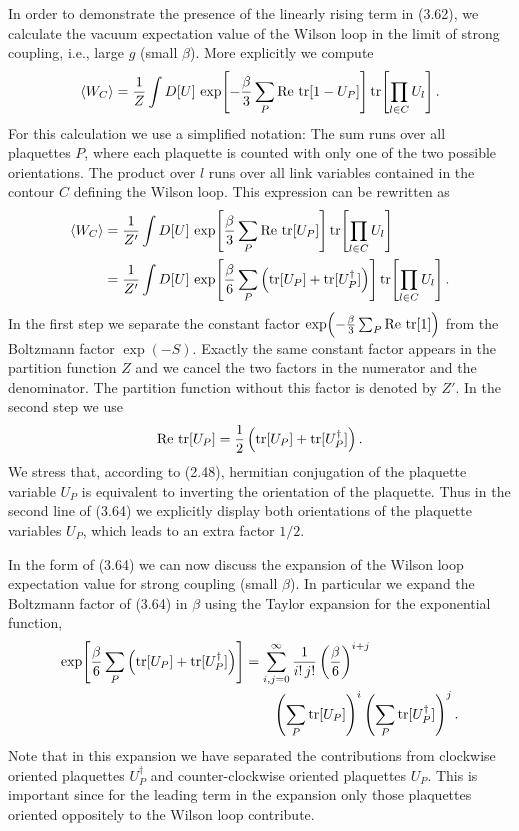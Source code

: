 In order to demonstrate the presence of the linearly rising term in (3.62), we
calculate the vacuum expectation value of the Wilson loop in the limit of
strong coupling, i.e., large $g$ (small $\beta$). More explicitly we compute
\begin{equation}
  \left\langle W_C \right\rangle = \frac{1}{Z}\int D[U]\,
    \exp\!\left[-\frac{\beta}{3}\sum_P \operatorname{Re}\,\operatorname{tr}[1 - U_P]\right]
    \operatorname{tr}\!\left[\prod_{l\in C} U_l\right] .
\end{equation}
For this calculation we use a simplified notation: The sum runs over all
plaquettes $P$, where each plaquette is counted with only one of the two
possible orientations. The product over $l$ runs over all link variables
contained in the contour $C$ defining the Wilson loop. This expression can be
rewritten as
\begin{equation}
\begin{split}
  \left\langle W_C \right\rangle &= \frac{1}{Z'}\int D[U]\,
    \exp\!\left[\frac{\beta}{3}\sum_P \operatorname{Re}\,\operatorname{tr}[U_P]\right]
    \operatorname{tr}\!\left[\prod_{l\in C} U_l\right] \\
  &= \frac{1}{Z'}\int D[U]\,
    \exp\!\left[\frac{\beta}{6}\sum_P \left(\operatorname{tr}[U_P] + \operatorname{tr}[U_P^\dagger]\right)\right]
    \operatorname{tr}\!\left[\prod_{l\in C} U_l\right] .
\end{split}
\end{equation}
In the first step we separate the constant factor
$\exp\!\left(-\frac{\beta}{3}\sum_P \operatorname{Re}\,\operatorname{tr}[1]\right)$ from the Boltzmann
factor $\exp(-S)$. Exactly the same constant factor appears in the partition
function $Z$ and we cancel the two factors in the numerator and the
denominator. The partition function without this factor is denoted by $Z'$.
In the second step we use
\begin{equation}
  \operatorname{Re}\,\operatorname{tr}[U_P] = \frac{1}{2}\left(\operatorname{tr}[U_P] + \operatorname{tr}[U_P^\dagger]\right) .
\end{equation}
We stress that, according to (2.48), hermitian conjugation of the plaquette
variable $U_P$ is equivalent to inverting the orientation of the plaquette.
Thus in the second line of (3.64) we explicitly display both orientations of
the plaquette variables $U_P$, which leads to an extra factor $1/2$.

In the form of (3.64) we can now discuss the expansion of the Wilson loop
expectation value for strong coupling (small $\beta$). In particular we expand
the Boltzmann factor of (3.64) in $\beta$ using the Taylor expansion for the
exponential function,
\begin{equation}
  \begin{split}
    \exp\!\left[\frac{\beta}{6}\sum_P \left(\operatorname{tr}[U_P] + \operatorname{tr}[U_P^\dagger]\right)\right]
    &= \sum_{i,j=0}^{\infty}\frac{1}{i!\,j!}\left(\frac{\beta}{6}\right)^{i+j}\\
    &\qquad \left(\sum_P \operatorname{tr}[U_P]\right)^{i}
      \left(\sum_P \operatorname{tr}[U_P^\dagger]\right)^{j} .
  \end{split}
\end{equation}
Note that in this expansion we have separated the contributions from clockwise
oriented plaquettes $U_P^\dagger$ and counter-clockwise oriented plaquettes
$U_P$. This is important since for the leading term in the expansion only those
plaquettes oriented oppositely to the Wilson loop contribute.

